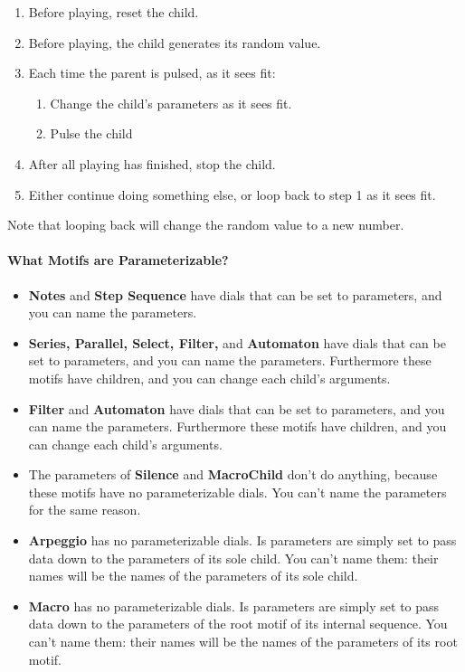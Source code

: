 \documentclass[twoside,10pt]{article}
\begin{document}
\begin{enumerate}
\item Before playing, reset the child.
\item Before playing, the child generates its random value.
\item Each time the parent is pulsed, as it sees fit:
\begin{enumerate}
\item Change the child's parameters as it sees fit.
\item Pulse the child
\end{enumerate}
\item After all playing has finished, stop the child.
\item Either continue doing something else, or loop back to step 1 as it sees fit. 
\end{enumerate}

Note that looping back will change the random value to a new number.

\paragraph{What Motifs are Parameterizable?}

\begin{itemize}
\item {\bf Notes} and {\bf Step Sequence} have dials that can be set to parameters, and you can name the parameters.
\item {\bf Series, Parallel, Select, Filter,} and {\bf Automaton} have dials that can be set to parameters, and you can name the parameters.  Furthermore these motifs have children, and you can change each child's arguments.
\item {\bf Filter} and {\bf Automaton} have dials that can be set to parameters, and you can name the parameters.  Furthermore these motifs have children, and you can change each child's arguments.
\item The parameters of {\bf Silence} and {\bf MacroChild} don't do anything, because these motifs have no parameterizable dials.    You can't name the parameters for the same reason.
\item {\bf Arpeggio} has no parameterizable dials.   Is parameters are simply set to pass data down to the parameters of its sole child.  You can't name them: their names will be the names of the parameters of its sole child.
\item {\bf Macro} has no parameterizable dials.   Is parameters are simply set to pass data down to the parameters of the root motif of its internal sequence.  You can't name them: their names will be the names of the parameters of its root motif.
\end{itemize}
\end{document}

